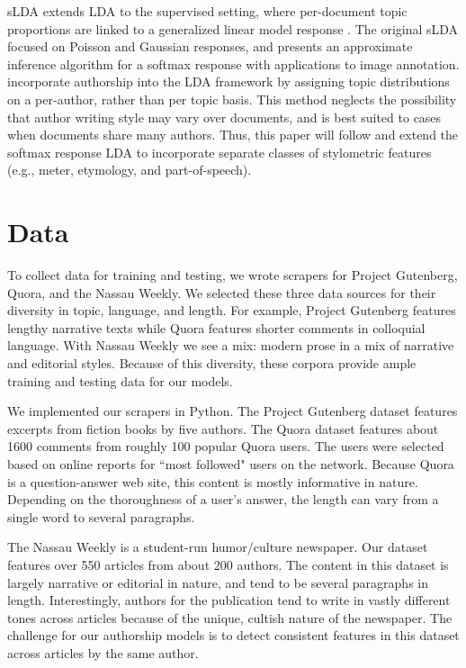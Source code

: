 \documentclass[14pt]{article} %
\theoremstyle{plain}
\theoremstyle{definition}
\theoremstyle{remark}
\begin{document}
	sLDA \cite{Blei2007} extends LDA to the supervised setting, where per-document topic proportions are linked to a generalized linear model response \cite{mccullagh1984generalized}. The original sLDA focused on Poisson and Gaussian responses, and \cite{wang2009simultaneous} presents an approximate inference algorithm for a softmax response with applications to image annotation. \citet{rosen2004author} incorporate authorship into the LDA framework by assigning topic distributions on a per-author, rather than per topic basis. This method neglects the possibility that author writing style may vary over documents, and is best suited to cases when documents share many authors. Thus, this paper will follow  \citet{wang2009simultaneous} and extend the softmax response LDA to incorporate separate classes of stylometric features (e.g., meter, etymology, and part-of-speech). 
 
\section{Data}
To collect data for training and testing, we wrote scrapers for Project Gutenberg, Quora, and the Nassau Weekly. We selected these three data sources for their diversity in topic, language, and length. For example, Project Gutenberg features lengthy narrative texts while Quora features shorter comments in colloquial language. With Nassau Weekly we see a mix: modern prose in a mix of narrative and editorial styles. Because of this diversity, these corpora provide ample training and testing data for our models.

We implemented our scrapers in Python. The Project Gutenberg dataset features excerpts from fiction books by five authors. The Quora dataset features about 1600 comments from roughly 100 popular Quora users. The users were selected based on online reports for ``most followed" users on the network. Because Quora is a question-answer web site, this content is mostly informative in nature. Depending on the thoroughness of a user's answer, the length can vary from a single word to several paragraphs.

The Nassau Weekly is a student-run humor/culture newspaper. Our dataset features over 550 articles from about 200 authors. The content in this dataset is largely narrative or editorial in nature, and tend to be several paragraphs in length. Interestingly, authors for the publication tend to write in vastly different tones across articles because of the unique, cultish nature of the newspaper. The challenge for our authorship models is to detect consistent features in this dataset across articles by the same author.
\end{document}
